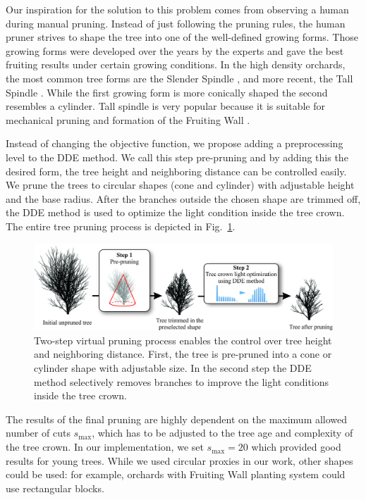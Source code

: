 \documentclass[1p]{elsarticle}
\begin{document}
Our inspiration for the solution to this problem comes from observing a
human during manual pruning. Instead of just following the pruning
rules, the human pruner strives to shape the tree into one of the
well-defined growing forms. Those growing forms were developed over the
years by the experts and gave the best fruiting results under certain
growing conditions. In the high density orchards, the most common tree
forms are the Slender Spindle \cite{weber_optimizing_2000}, and more recent, the Tall
Spindle \cite{robinson_vision_2013}. While the first growing form is more conically shaped
the second resembles a cylinder. Tall spindle is very popular because it
is suitable for mechanical pruning and formation of the Fruiting Wall
\cite{robinson_vision_2013}.

Instead of changing the objective function, we propose adding a
preprocessing level to the DDE method. We call this step pre-pruning and
by adding this the desired form, the tree height and neighboring
distance can be controlled easily. We prune the trees to circular shapes
(cone and cylinder) with adjustable height and the base radius. After
the branches outside the chosen shape are trimmed off, the DDE method is
used to optimize the light condition inside the tree crown. The entire
tree pruning process is depicted in Fig.~\ref{fig:my_figure3}.
\begin{figure}[hbt]
    \centering
    \includegraphics[width=5.3in]{figs/image3.jpeg}
    \caption{Two-step virtual pruning process enables the control
over tree height and neighboring distance. First, the tree is pre-pruned
into a cone or cylinder shape with adjustable size. In the second step
the DDE method selectively removes branches to improve the light
conditions inside the tree crown.}
    \label{fig:my_figure3}
\end{figure}

The results of the final pruning are highly dependent on the maximum
allowed number of cuts \(s_{\mathrm{\max}}\), which has to be adjusted
to the tree age and complexity of the tree crown. In our implementation,
we set \(s_{\mathrm{\max}} = 20\) which provided good results for young
trees. While we used circular proxies in our work, other shapes could be
used: for example, orchards with Fruiting Wall planting system could use
rectangular blocks.
\end{document}
